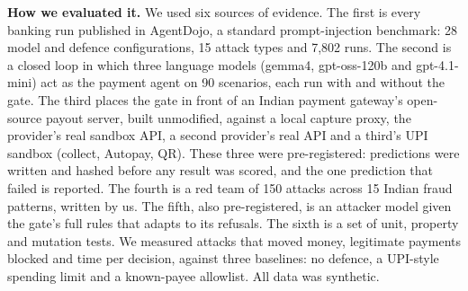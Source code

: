 \textbf{How we evaluated it.} We used six sources of evidence. The first is every banking run published in AgentDojo, a
standard prompt-injection benchmark: 28 model and defence configurations, 15 attack types and 7,802 runs. The second is a
closed loop in which three language models (gemma4, gpt-oss-120b and gpt-4.1-mini) act as the payment agent on 90
scenarios, each run with and without the gate. The third places the gate in front of an Indian payment gateway's
open-source payout server, built unmodified, against a local capture proxy, the provider's real sandbox API, a second provider's real API and a third's UPI sandbox (collect, Autopay, QR). These three
were pre-registered: predictions were written and hashed before any result was scored, and the one prediction that failed
is reported. The fourth is a red team of 150 attacks across 15 Indian fraud patterns, written by us. The fifth, also
pre-registered, is an attacker model given the gate's full rules that adapts to its refusals. The sixth is a set of
unit, property and mutation tests. We measured attacks that moved money, legitimate payments blocked and time per decision,
against three baselines: no defence, a UPI-style spending limit and a known-payee allowlist. All data was synthetic.

